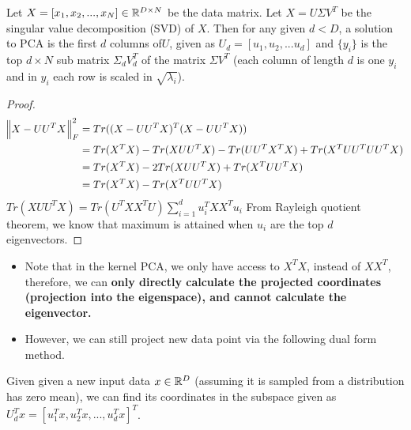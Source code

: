 \begin{refsection}
\begin{theorem}
\cite[21]{ma2002generalized}Let $X = [x_1,x_2,...,x_N] \in \mathbb{R}^{D\times N}$ be the data matrix. Let $X = U\Sigma V^T$ be the singular value decomposition (SVD) of $X$. Then for any given $d < D$, a solution to PCA is the first $d$ columns of$U$, given as $U_d = [u_1,u_2,...u_d]$ and $\{y_i\}$ is the top $d\times N$ sub matrix $\Sigma_d V_d^T$ of the matrix $\Sigma V^T$ (each column of length $d$ is one $y_i$ and in $y_i$ each row is scaled in $\sqrt{\lambda_i}$). 
\end{theorem}
\begin{proof}
\begin{align*}
    \norm{X - UU^TX}^2_F &= Tr((X - UU^TX)^T(X - UU^TX))\\
            &=Tr(X^TX) - Tr(XUU^TX) - Tr(UU^TX^TX) + Tr(X^TUU^TUU^TX)\\
            &=Tr(X^TX) - 2Tr(XUU^TX) + Tr(X^TUU^TX)\\
            &=Tr(X^TX) - Tr(X^TUU^TX)\\
\end{align*}
$Tr(XUU^TX) = Tr(U^TXX^TU)\sum_{i=1}^d u_i^T XX^T u_i$
From Rayleigh quotient theorem, we know that maximum is attained when $u_i$ are the top $d$ eigenvectors. 

\end{proof}



\begin{remark}\cite[142]{shawe2004kernel}\hfill
\begin{itemize}
    \item Note that in the kernel PCA, we only have access to $X^TX$, instead of $XX^T$, therefore, we can \textbf{only directly calculate the projected coordinates (projection into the eigenspace), and cannot calculate the eigenvector.}
    \item However, we can still project new data point via the following dual form method. 
\end{itemize}
\end{remark}






\begin{lemma}
Given given a new input data $x\in \mathbb{R}^D$ (assuming it is sampled from a distribution has zero mean), we can find its coordinates in the subspace given as $U_d^T x = [u_1^Tx,u_2^Tx,...,u_d^Tx]^T$.
\end{lemma}



\end{refsection}
